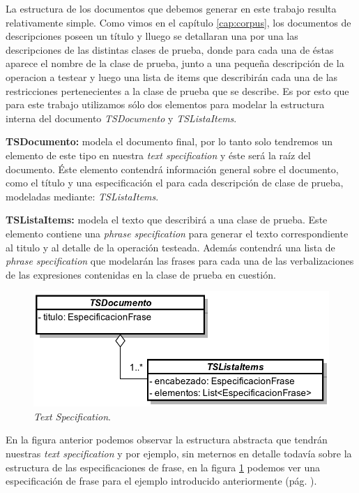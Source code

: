 La estructura de los documentos que debemos generar en este trabajo resulta relativamente simple. Como vimos en el capítulo \ref{cap:corpus}, los documentos de descripciones poseen un título y lluego se detallaran una por una las descripciones de las distintas clases de prueba, donde para cada una de éstas aparece el nombre de la clase de prueba, junto a una pequeña descripción de la operacion a testear y luego una lista de items que describirán cada una de las restricciones pertenecientes a la clase de prueba que se describe. Es por esto que para este trabajo utilizamos sólo dos elementos para modelar la estructura interna del documento \emph{TSDocumento} y \emph{TSListaItems}.

\medskip
\noindent
\textbf{TSDocumento:} modela el documento final, por lo tanto solo tendremos un elemento de este tipo en nuestra \emph{text specification} y éste será la raíz del documento. Éste elemento contendrá información general sobre el documento, como el título y una especificación el para cada descripción de clase de prueba, modeladas mediante: \emph{TSListaItems}.

\medskip
\noindent
\textbf{TSListaItems:} modela el texto que describirá a una clase de prueba. Este elemento contiene una \emph{phrase specification} para generar el texto correspondiente al titulo y al detalle de la operación testeada. Además contendrá una lista de \emph{phrase specification} que modelarán las frases para cada una de las verbalizaciones de las expresiones contenidas en la clase de prueba en cuestión.

\begin{figure}[H]
  	\centering
	\includegraphics[scale=0.3]{img/text_spec.png}
	\caption{\emph{Text Specification}.}
  	\label{fig:text_spec}
\end{figure}

En la figura anterior podemos observar la estructura abstracta que tendrán nuestras \emph{text specification} y por ejemplo, sin meternos en detalle todavía sobre la estructura de las especificaciones de frase, en la figura \ref{fig:text_spec} podemos ver una especificación de frase para el ejemplo introducido anteriormente (pág. \pageref{fig:ej_corpus}).

